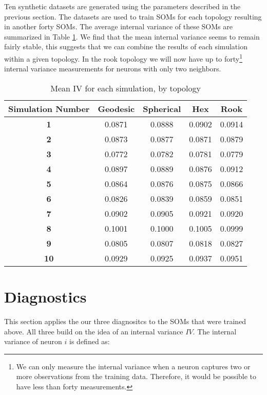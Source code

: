 Ten synthetic datasets are generated using the parameters described in the
previous section. The datasets are used to train SOMs for each topology
resulting in another forty SOMs. The average internal variance of these SOMs
are summarized in Table \ref{ivtable3}.  We find that the mean internal
variance seems to remain fairly stable, this suggests that we can combine the
results of each simulation within a given topology. In the rook topology we
will now have up to forty\footnote{We can only measure the internal variance
when a neuron captures two or more observations from the training data.
Therefore, it would be possible to have less than forty measurements.}
internal variance measurements for neurons with only two neighbors.

\begin{table}[hbt]
\centering
\caption{Mean IV for each simulation, by topology}
\label{ivtable3}
\begin{tabular}{|c||c|c|c|c|}
\hline
\textbf{Simulation Number} & Geodesic & Spherical & Hex & Rook \\
\hline
\hline
\textbf{1} & 0.0871 & 0.0888 & 0.0902 & 0.0914 \\
\hline
\textbf{2} & 0.0873 & 0.0877 & 0.0871 & 0.0879 \\
\hline
\textbf{3} & 0.0772 & 0.0782 & 0.0781 & 0.0779 \\
\hline
\textbf{4} & 0.0897 & 0.0889 & 0.0876 & 0.0912 \\
\hline
\textbf{5} & 0.0864 & 0.0876 & 0.0875 & 0.0866 \\
\hline
\textbf{6} & 0.0826 & 0.0839 & 0.0859 & 0.0851 \\
\hline
\textbf{7} & 0.0902 & 0.0905 & 0.0921 & 0.0920 \\
\hline
\textbf{8} & 0.1001 & 0.1000 & 0.1005 & 0.0999 \\
\hline
\textbf{9} & 0.0805 & 0.0807 & 0.0818 & 0.0827 \\
\hline
\textbf{10} & 0.0929 & 0.0925 & 0.0937 & 0.0951 \\
\hline
\end{tabular} \end{table}

\section{Diagnostics}
This section applies the our three diagnositcs to the SOMs that were trained
above.  All three build on the idea of an internal variance \(IV\). The
internal variance of neuron \(i\) is defined as:

